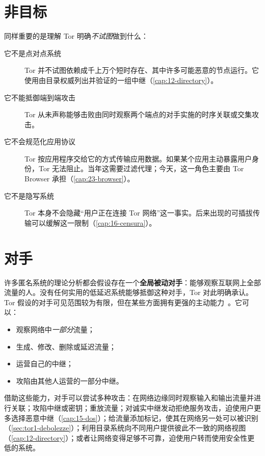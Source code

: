 \section{非目标}\label{sec:minaccia-nonobiettivi}

同样重要的是理解 Tor 明确\emph{不试图}做到什么：
\begin{description}
  \item[它不是点对点系统] Tor 并不试图依赖成千上万个短时存在、其中许多可能恶意的节点运行。它使用由目录权威列出并验证的一组中继（\cref{cap:12-directory}）。
  \item[它不能抵御端到端攻击] Tor 从未声称能够击败由同时观察两个端点的对手实施的时序关联或交集攻击。
  \item[它不会规范化应用协议] Tor 按应用程序交给它的方式传输应用数据。如果某个应用主动暴露用户身份，Tor 无法阻止。当年这需要过滤代理；今天，这一角色主要由 Tor Browser 承担（\cref{cap:23-browser}）。
  \item[它不是隐写系统] Tor 本身不会隐藏“用户正在连接 Tor 网络”这一事实。后来出现的可插拔传输可以缓解这一限制（\cref{cap:16-censura}）。
\end{description}

\section{对手}\label{sec:minaccia-avversario}

许多匿名系统的理论分析都会假设存在一个\textbf{全局被动对手}：能够观察互联网上全部流量的人。没有任何实用的低延迟系统能够抵御这种对手，Tor 对此明确承认。Tor 假设的对手可见范围较为有限，但在某些方面拥有更强的主动能力~\cite{dingledine2004tor}。它可以：
\begin{itemize}
  \item 观察网络中\emph{一部分}流量；
  \item 生成、修改、删除或延迟流量；
  \item 运营自己的中继；
  \item 攻陷由其他人运营的一部分中继。
\end{itemize}
借助这些能力，对手可以尝试多种攻击：在网络边缘同时观察输入和输出流量并进行关联；攻陷中继或密钥；重放流量；对诚实中继发动拒绝服务攻击，迫使用户更多选择恶意中继（\cref{cap:15-dos}）；给流量添加标记，使其在网络另一处可以被识别（\cref{sec:tor1-debolezze}）；利用目录系统向不同用户提供彼此不一致的网络视图（\cref{cap:12-directory}）；或者让网络变得足够不可靠，迫使用户转而使用安全性更低的系统。

